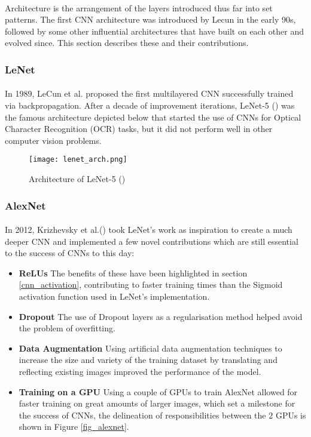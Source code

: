 \paragraph{}
Architecture is the arrangement of the layers introduced thus far into set patterns. The first \gls{CNN} architecture was introduced by Lecun in the early 90s, followed by some other influential architectures that have built on each other and evolved since. This section describes these and their contributions.

\subsubsection{LeNet}
\paragraph{}
In 1989, LeCun et al. proposed the first multilayered \gls{CNN} successfully trained via backpropagation. After a decade of improvement iterations, LeNet-5 (\cite{726791}) was the famous architecture depicted below that started the use of \gls{CNN}s for Optical Character Recognition (OCR) tasks, but it did not perform well in other computer vision problems.

    \begin{figure}[hbt!]
        \centering
        \texttt{[image: lenet\_arch.png]}
        \caption{Architecture of LeNet-5 (\cite{726791})}
        \label{fig_lenet}
    \end{figure}
    
\subsubsection{AlexNet}
\paragraph{}
In 2012, Krizhevsky et al.(\cite{10.5555/2999134.2999257}) took LeNet's work as inspiration to create a much deeper \gls{CNN} and implemented a few novel contributions which are still essential to the success of \gls{CNN}s to this day:
\begin{itemize}
    \item \textbf{\gls{ReLU}s} The benefits of these have been highlighted in section \ref{cnn_activation}, contributing to faster training times than the Sigmoid activation function used in LeNet's implementation.
    \item \textbf{Dropout} The use of Dropout layers as a regularisation method helped avoid the problem of overfitting.
    \item \textbf{Data Augmentation} Using artificial data augmentation techniques to increase the size and variety of the training dataset by translating and reflecting existing images improved the performance of the model.
     \item \textbf{Training on a \gls{GPU}} Using a couple of \gls{GPU}s to train AlexNet allowed for faster training on great amounts of larger images, which set a milestone for the success of \gls{CNN}s, the delineation of responsibilities between the $2$ \gls{GPU}s is shown in Figure \ref{fig_alexnet}.
\end{itemize}

